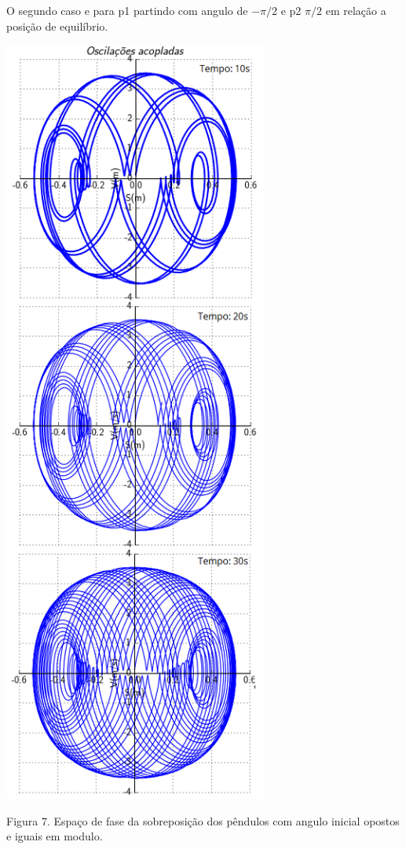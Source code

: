 \documentclass[a4paper]{article} %
\begin{document}
O segundo caso  e para  p1 partindo com angulo de $-\pi/2$ e p2 $\pi/2$ em relação a posição de equilíbrio.

\begin{center}
	\includegraphics[width=3.41in,height=10.00in, keepaspectratio=false]{pendulo_acoplado7.PNG}
	
	\scriptsize{Figura 7. Espaço de fase da sobreposição dos pêndulos com angulo inicial opostos e iguais em modulo.}
\end{center}
\end{document}
